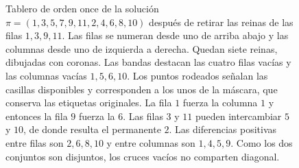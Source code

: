 \begin{figure}[htbp]
\centering
{}
\caption{Tablero de orden once de la solución $\pi=(1,3,5,7,9,11,2,4,6,8,10)$ después de retirar las
reinas de las filas $1,3,9,11$. Las filas se numeran desde uno de arriba abajo y las columnas desde
uno de izquierda a derecha. Quedan siete reinas, dibujadas con coronas. Las bandas destacan las cuatro
filas vacías y las columnas vacías $1,5,6,10$. Los puntos rodeados señalan las casillas disponibles y
corresponden a los unos de la máscara, que conserva las etiquetas originales. La fila $1$ fuerza la
columna $1$ y entonces la fila $9$ fuerza la $6$. Las filas $3$ y $11$ pueden intercambiar $5$ y $10$,
de donde resulta el permanente $2$. Las diferencias positivas entre filas son $2,6,8,10$ y entre
columnas son $1,4,5,9$. Como los dos conjuntos son disjuntos, los cruces vacíos no comparten
diagonal.}\label{fig:terminal}
\end{figure}

